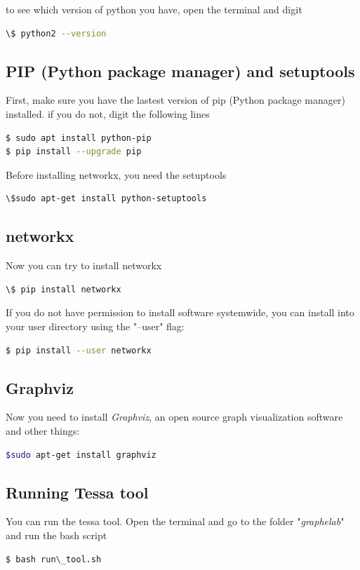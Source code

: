{to see which version of python you have, open the terminal and digit\\
\begin{lstlisting}[language=bash]
\$ python2 --version
\end{lstlisting}


\subsection{PIP (Python package manager) and setuptools}
First, make sure you have the lastest version of pip (Python package manager) installed.
if you do not, digit the following lines\\
\begin{lstlisting}[language=bash]
$ sudo apt install python-pip
$ pip install --upgrade pip
\end{lstlisting}

Before installing networkx, you need the setuptools\\
\begin{lstlisting}[language=bash]
\$sudo apt-get install python-setuptools
\end{lstlisting}

\subsection{networkx}
Now you can try to install networkx\\
\begin{lstlisting}[language=bash]
\$ pip install networkx
\end{lstlisting}


If you do not have permission to install software systemwide, you can install into your user directory using the "--user" flag:\\
\begin{lstlisting}[language=bash]
$ pip install --user networkx
\end{lstlisting}

\subsection{Graphviz}
Now you need to install \textit{Graphviz}, an open source graph visualization software and other things:\\
\begin{lstlisting}[language=bash]
$sudo apt-get install graphviz
\end{lstlisting}


\subsection{Running Tessa tool}
You can run the tessa tool.
Open the terminal and go to the folder "\textit{graphelab}" and run the bash script\\
\begin{lstlisting}[language=bash]
$ bash run\_tool.sh
\end{lstlisting}


}
